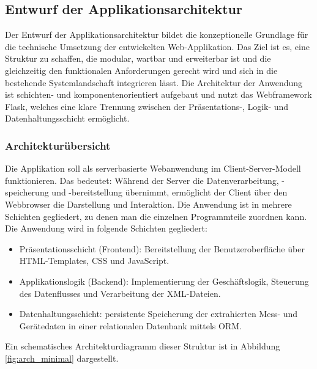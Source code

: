 \subsection{Entwurf der Applikationsarchitektur}
\label{subsec:entwurf-der-applikationsarchitektur}


Der Entwurf der Applikationsarchitektur bildet die konzeptionelle Grundlage für die technische Umsetzung der entwickelten Web-Applikation.
Das Ziel ist es, eine Struktur zu schaffen, die modular, wartbar und erweiterbar ist und die gleichzeitig den funktionalen Anforderungen gerecht wird und sich in die bestehende Systemlandschaft integrieren lässt.
Die Architektur der Anwendung ist schichten- und komponentenorientiert aufgebaut und nutzt das Webframework Flask, welches eine klare Trennung zwischen der Präsentations-, Logik- und Datenhaltungsschicht ermöglicht.


\subsubsection{Architekturübersicht}
\label{subsubsec:arch}
Die Applikation soll als serverbasierte Webanwendung im Client-Server-Modell funktionieren.
Das bedeutet: Während der Server die Datenverarbeitung, -speicherung und -bereitstellung übernimmt, ermöglicht der Client über den Webbrowser die Darstellung und Interaktion.
Die Anwendung ist in mehrere Schichten gegliedert, zu denen man die einzelnen Programmteile zuordnen kann.
Die Anwendung wird in folgende Schichten gegliedert:

\begin{itemize}
\item Präsentationsschicht (Frontend): Bereitstellung der Benutzeroberfläche über HTML-Templates, CSS und JavaScript.

\item
Applikationslogik (Backend): Implementierung der Geschäftslogik, Steuerung des Datenflusses und Verarbeitung der XML-Dateien.

\item
Datenhaltungsschicht: persistente Speicherung der extrahierten Mess- und Gerätedaten in einer relationalen Datenbank mittels ORM.

\end{itemize}

Ein schematisches Architekturdiagramm dieser Struktur ist in Abbildung \ref{fig:arch_minimal} dargestellt.

